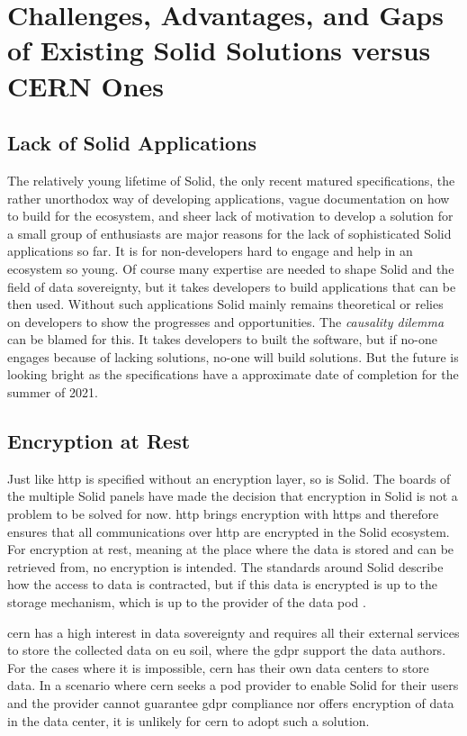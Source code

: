 \section{Challenges, Advantages, and Gaps of Existing Solid Solutions versus CERN Ones}

\subsection{Lack of Solid Applications}\label{challenges:lack}

The relatively young lifetime of Solid, the only recent matured specifications, the rather unorthodox way of developing applications, vague documentation on how to build for the ecosystem, and sheer lack of motivation to develop a solution for a small group of enthusiasts are major reasons for the lack of sophisticated Solid applications so far. It is for non-developers hard to engage and help in an ecosystem so young. Of course many expertise are needed to shape Solid and the field of data sovereignty, but it takes developers to build applications that can be then used. Without such applications Solid mainly remains theoretical or relies on developers to show the progresses and opportunities. The \textit{causality dilemma} can be blamed for this. It takes developers to built the software, but if no-one engages because of lacking solutions, no-one will build solutions. But the future is looking bright as the specifications have a approximate date of completion for the summer of 2021.

\subsection{Encryption at Rest}

Just like \gls{http} is specified without an encryption layer, so is Solid. The boards of the multiple Solid panels \cite{solid-panels} have made the decision that encryption in Solid is not a problem to be solved for now. \gls{http} brings encryption with \gls{https} and therefore ensures that all communications over \gls{http} are encrypted in the Solid ecosystem. For encryption at rest, meaning at the place where the data is stored and can be retrieved from, no encryption is intended. The standards around Solid describe how the access to data is contracted, but if this data is encrypted is up to the storage mechanism, which is up to the provider of the data pod \cite{solidproject-faqs}.

\gls{cern} has a high interest in data sovereignty and requires all their external services to store the collected data on \gls{eu} soil, where the \gls{gdpr} support the data authors. For the cases where it is impossible, \gls{cern} has their own data centers to store data. In a scenario where \gls{cern} seeks a pod provider to enable Solid for their users and the provider cannot guarantee \gls{gdpr} compliance nor offers encryption of data in the data center, it is unlikely for \gls{cern} to adopt such a solution.


